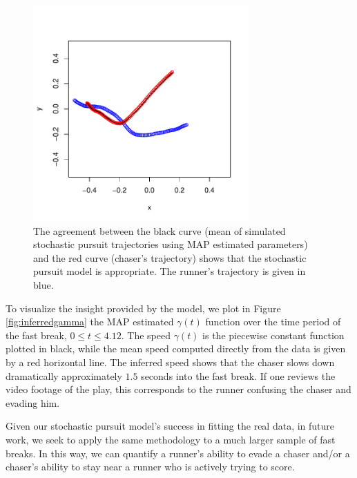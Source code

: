 \documentclass[graybox]{svmult}
\begin{document}
\begin{figure}
\vspace{-0.6in}
\begin{center}
\includegraphics[width=3.25in]{nbaspatial}
\end{center}
\vspace{-0.25in}
\caption{The agreement between the black curve (mean of simulated
  stochastic pursuit trajectories using MAP estimated parameters) and
  the red curve (chaser's trajectory) shows that the stochastic
  pursuit model is appropriate.  The runner's trajectory is given in blue.}
\label{fig:nbaspatial}
\end{figure}

To visualize the insight provided by the model, we plot in Figure
\ref{fig:inferredgamma} the MAP
estimated $\gamma(t)$ function over the time period of the fast break,
$0 \leq t \leq 4.12$.  The speed $\gamma(t)$ is the piecewise constant
function plotted in black, while the mean speed computed directly from
the data is given by a red horizontal line.  The inferred speed shows
that the chaser slows down dramatically approximately $1.5$ seconds
into the fast break.  If one reviews the video footage of the play,
this corresponds to the runner confusing the chaser and evading him.

Given our stochastic pursuit model's success in fitting the real data,
in future work, we seek to apply the same methodology to a much larger
sample of fast breaks.  In this way, we can quantify a runner's
ability to evade a chaser and/or a chaser's ability to stay near a
runner who is actively trying to score.
\end{document}
